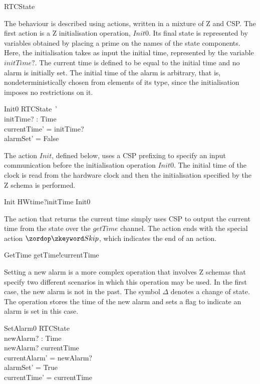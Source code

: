 \documentclass[a4paper,10pt]{report}
\begin{document}
\begin{circusaction}
  \circstate RTCState
\end{circusaction}
%
The behaviour is described using actions, written in a mixture of Z and CSP. The
first action is a Z initialisation operation, $Init0$.  Its final state is
represented by variables obtained by placing a prime on the names of the state
components.  Here, the initialisation takes as input the initial time,
represented by the variable $initTime?$. The current time is defined to be equal
to the initial time and no alarm is initially set. The initial time of the alarm
is arbitrary, that is, nondeterministically chosen from elements of its type,
since the initialisation imposes no restrictions on it.
%
\begin{schema}{Init0}
  RTCState~' \\
  initTime? : Time \\
\where
  currentTime' = initTime? \\
  alarmSet' = False \\
\end{schema}
%
The action $Init$, defined below, uses a CSP prefixing to specify an input
communication before the initialisation operation $Init0$.  The initial time of
the clock is read from the hardware clock and then the initialisation specified
by the Z schema is performed.
%
\begin{circusaction}
  Init \circdef HWtime?initTime \then Init0
\end{circusaction}
%
The action that returns the current time simply uses CSP to output the current
time from the state over the $getTime$ channel. The action ends with the special
action $\Skip$, which indicates the end of an action.
%
\begin{circusaction}
  GetTime \circdef getTime!currentTime \then \Skip
\end{circusaction}
%
Setting a new alarm is a more complex operation that involves Z schemas that
specify two different scenarios in which this operation may be used. In the
first case, the new alarm is not in the past. The symbol $\Delta$ denotes a
change of state. The operation stores the time of the new alarm and sets a flag
to indicate an alarm is set in this case.
%
\begin{schema}{SetAlarm0}
  \Delta RTCState \\
  newAlarm? : Time \\
\where
  newAlarm? \geq currentTime \\
  currentAlarm' = newAlarm? \\
  alarmSet' = True \\
  currentTime' = currentTime \\
\end{schema}
\end{document}
